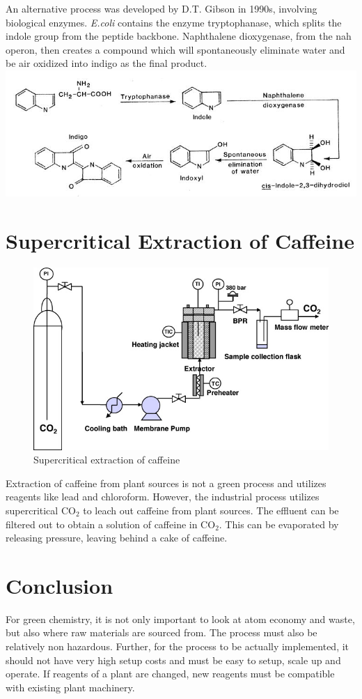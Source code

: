 \documentclass[pdftex,12pt,a4paper]{article}
\begin{document}
An alternative process was developed by D.T. Gibson in 1990s, involving biological enzymes. \textit{E.coli} contains the enzyme tryptophanase, which splits the indole group from the peptide backbone. Naphthalene dioxygenase, from the nah operon, then creates a compound which will spontaneously eliminate water and be air oxidized into indigo as the final product. \\
\includegraphics[clip=true,trim=0pt 0pt 0pt 0pt,scale=0.77]{2bfebi3.jpg}
\section{Supercritical Extraction of Caffeine}
\begin{figure}[htb]
\centering
\includegraphics[clip=true,trim=0pt 0pt 0pt 0pt,scale=0.58]{28febi2.jpg}
\caption{Supercritical extraction of caffeine}
\end{figure}
Extraction of caffeine from plant sources is not a green process and utilizes reagents like lead and chloroform. However, the industrial process utilizes supercritical CO$_2$ to leach out caffeine from plant sources. The effluent can be filtered out to obtain a solution of caffeine in CO$_2$. This can be evaporated by releasing pressure, leaving behind a cake of caffeine.
\section*{Conclusion}
For green chemistry, it is not only important to look at atom economy and waste, but also where raw materials are sourced from. The process must also be relatively non hazardous. Further, for the process to be actually implemented, it should not have very high setup costs and must be easy to setup, scale up and operate. If reagents of a plant are changed, new reagents must be compatible with existing plant machinery.
\end{document}

